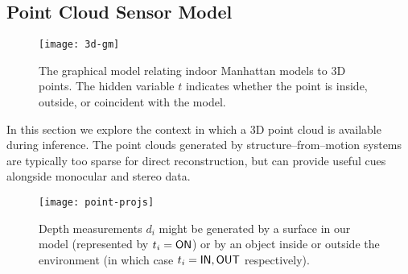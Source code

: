 \subsection{Point Cloud Sensor Model}

\begin{figure}[tb]
  \centering
  \texttt{[image: 3d-gm]}
  \caption{The graphical model relating indoor Manhattan models to 3D
    points. The hidden variable $t$ indicates whether the point is
    inside, outside, or coincident with the model.}
  \label{fig:3d-gm}
\end{figure}

In this section we explore the context in which a 3D point cloud is
available during inference. The point clouds generated by
structure--from--motion systems are typically too sparse for direct
reconstruction, but can provide useful cues alongside monocular and
stereo data.

\begin{figure}[tb]
  \centering \texttt{[image: point-projs]}
  \caption{Depth measurements $d_i$ might be generated by a surface in
    our model (represented by $t_i=\ON$) or by an object inside or
    outside the environment (in which case $t_i=\IN,\OUT$
    respectively).}
  \label{fig:point-projs}
\end{figure}




